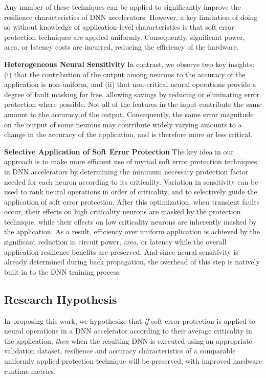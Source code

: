 Any number of these techniques can be applied to significantly improve the resilience characteristics of DNN accelerators.
However, a key limitation of doing so without knowledge of application-level characteristics is that soft error protection techniques are applied uniformly.
Consequently, significant power, area, or latency costs are incurred, reducing the efficiency of the hardware.

\textbf{Heterogeneous Neural Sensitivity}
In contrast, we observe two key insights: (i) that the contribution of the output among neurons to the accuracy of the application is non-uniform, and (ii) that non-critical neural operations provide a degree of fault masking for free, allowing savings by reducing or eliminating error protection where possible.
Not all of the features in the input contribute the same amount to the accuracy of the output.
Consequently, the same error magnitude on the output of some neurons may contribute widely varying amounts to a change in the accuracy of the application, and is therefore more or less critical. 

\textbf{Selective Application of Soft Error Protection}
The key idea in our approach is to make more efficient use of myriad soft error protection techniques in DNN accelerators by determining the minimum necessary protection factor needed for each neuron according to its criticality.
Variation in sensitivity can be used to rank neural operations in order of criticality, and to selectively guide the application of soft error protection.
After this optimization, when transient faults occur, their effects on high criticality neurons are masked by the protection technique, while their effects on low criticality neurons are inherently masked by the application.
As a result, efficiency over uniform application is achieved by the significant reduction in circuit power, area, or latency while the overall application resilience benefits are preserved.
And since neural sensitivity is already determined during back propagation, the overhead of this step is natively built in to the DNN training process.

\subsection{Research Hypothesis}
In proposing this work, we hypothesize that \textit{if} soft error protection is applied to neural operations in a DNN accelerator according to their average criticality in the application, \textit{then} when the resulting DNN is executed using an appropriate validation dataset, resilience and accuracy characteristics of a comparable uniformly applied protection technique will be preserved, with improved hardware runtime metrics.

